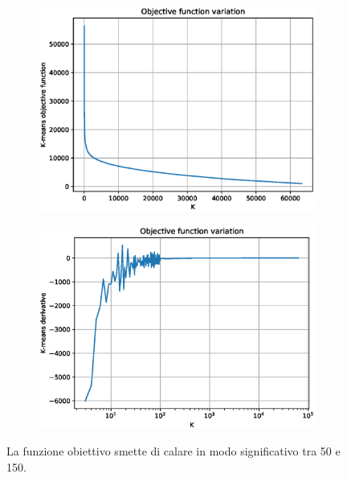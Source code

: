 \documentclass[
	11pt, %
	a4paper, %
	oneside, %
	headinclude,footinclude, %
	BCOR5mm, %
]{scrartcl}
\begin{document}
		\begin{figure}[!htb]
			\hspace{-1cm}
			\begin{subfigure}{.5\textwidth}
				\centering
				\includegraphics[scale=.5]{Figures/KMeans.eps}
			\end{subfigure}
			\hspace{0.5cm}
			\begin{subfigure}{.5\textwidth}
				\centering
				\includegraphics[scale=.5]{Figures/KMeansDerivative.eps}
			\end{subfigure}
			\caption{La funzione obiettivo smette di calare in modo significativo tra 50 e 150.}
			\label{fig:KMeansObj}
		\end{figure}
\end{document}
